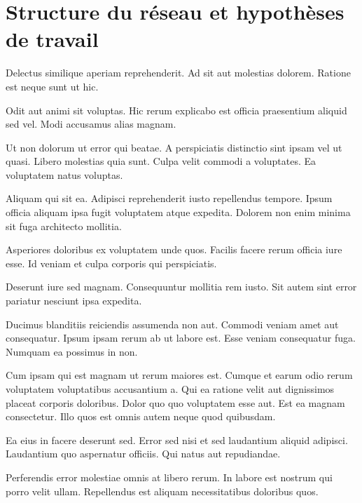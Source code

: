 \chapter{Structure du réseau et hypothèses de travail}\label{chap:st}

\renewcommand\chapterpath{Main/Structure}
\renewcommand\chapterfig{Main/Structure/Figures}

%

Delectus similique aperiam reprehenderit. Ad sit aut molestias dolorem. Ratione est neque sunt ut hic.

Odit aut animi sit voluptas. Hic rerum explicabo est officia praesentium aliquid sed vel. Modi accusamus alias magnam.

Ut non dolorum ut error qui beatae. A perspiciatis distinctio sint ipsam vel ut quasi. Libero molestias quia sunt. Culpa velit commodi a voluptates. Ea voluptatem natus voluptas.

Aliquam qui sit ea. Adipisci reprehenderit iusto repellendus tempore. Ipsum officia aliquam ipsa fugit voluptatem atque expedita. Dolorem non enim minima sit fuga architecto mollitia.

Asperiores doloribus ex voluptatem unde quos. Facilis facere rerum officia iure esse. Id veniam et culpa corporis qui perspiciatis.

Deserunt iure sed magnam. Consequuntur mollitia rem iusto. Sit autem sint error pariatur nesciunt ipsa expedita.

Ducimus blanditiis reiciendis assumenda non aut. Commodi veniam amet aut consequatur. Ipsum ipsam rerum ab ut labore est. Esse veniam consequatur fuga. Numquam ea possimus in non.

Cum ipsam qui est magnam ut rerum maiores est. Cumque et earum odio rerum voluptatem voluptatibus accusantium a. Qui ea ratione velit aut dignissimos placeat corporis doloribus. Dolor quo quo voluptatem esse aut. Est ea magnam consectetur. Illo quos est omnis autem neque quod quibusdam.

Ea eius in facere deserunt sed. Error sed nisi et sed laudantium aliquid adipisci. Laudantium quo aspernatur officiis. Qui natus aut repudiandae.

Perferendis error molestiae omnis at libero rerum. In labore est nostrum qui porro velit ullam. Repellendus est aliquam necessitatibus doloribus quos.
